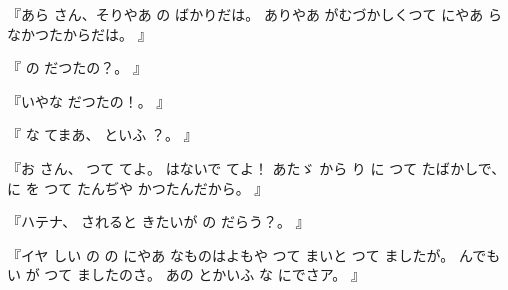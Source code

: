 『あら
さん、そりやあ
の
ばかりだは。
ありやあ
がむづかしくつて
にやあ
らなかつたからだは。
』

『
の
だつたの？。
』

『いやな
だつたの！。
』

『
な
てまあ、
といふ
？。
』

『お
さん、
つて
てよ。
はないで
てよ！
あたゞ
から
り
に
つて
たばかしで、
に
を
つて
たんぢや
かつたんだから。
』

『ハテナ、
されると
きたいが
の
だらう？。
』

『イヤ
しい
の
の
にやあ
なものはよもや
つて
まいと
つて
ましたが。
んでも
い
が
つて
ましたのさ。
あの
とかいふ
な
にでさア。
』

